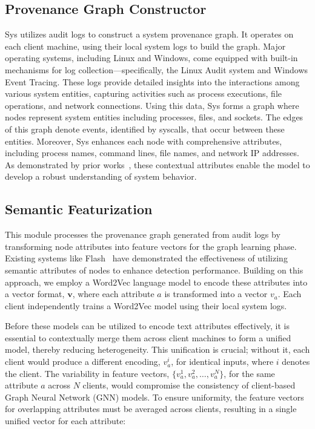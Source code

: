 \subsection{Provenance Graph Constructor} 
Sys utilizes audit logs to construct a system provenance graph. It operates on each client machine, using their local system logs to build the graph. Major operating systems, including Linux and Windows, come equipped with built-in mechanisms for log collection—specifically, the Linux Audit system and Windows Event Tracing. These logs provide detailed insights into the interactions among various system entities, capturing activities such as process executions, file operations, and network connections. Using this data, Sys forms a graph where nodes represent system entities including processes, files, and sockets. The edges of this graph denote events, identified by syscalls, that occur between these entities. Moreover, Sys enhances each node with comprehensive attributes, including process names, command lines, file names, and network IP addresses. As demonstrated by prior works~\cite{flash2024,cheng2023kairos}, these contextual attributes enable the model to develop a robust understanding of system behavior.

\subsection{Semantic Featurization}

This module processes the provenance graph generated from audit logs by transforming node attributes into feature vectors for the graph learning phase. Existing systems like Flash~\cite{flash2024} have demonstrated the effectiveness of utilizing semantic attributes of nodes to enhance detection performance. Building on this approach, we employ a Word2Vec language model to encode these attributes into a vector format, \(\mathbf{v}\), where each attribute \(a\) is transformed into a vector \(v_a\). Each client independently trains a Word2Vec model using their local system logs.

Before these models can be utilized to encode text attributes effectively, it is essential to contextually merge them across client machines to form a unified model, thereby reducing heterogeneity. This unification is crucial; without it, each client would produce a different encoding, \(v_a^i\), for identical inputs, where \(i\) denotes the client. The variability in feature vectors, \(\{v_a^1, v_a^2, \ldots, v_a^N\}\), for the same attribute \(a\) across \(N\) clients, would compromise the consistency of client-based Graph Neural Network (GNN) models. To ensure uniformity, the feature vectors for overlapping attributes must be averaged across clients, resulting in a single unified vector for each attribute:

